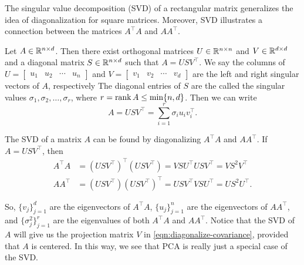The singular value decomposition (SVD) of a rectangular matrix generalizes the idea of diagonalization for square matrices.
Moreover, SVD illustrates a connection between the matrices \(A^\top A\) and \(AA^\top\).

\begin{theorem}
    \label{thm:svd}
    \cite{horn2013matrix}
    Let \(A \in \mathbb{R}^{n \times d}\).
    Then there exist orthogonal matrices \(U \in \mathbb{R}^{n \times n}\) and \(V \in \mathbb{R}^{d \times d}\) and a diagonal matrix \(S \in \mathbb{R}^{n \times d}\) such that \(A = USV^\top\).
    We say the columns of \(U = \begin{bmatrix}
        u_1 & u_2 & \cdots & u_n
    \end{bmatrix}\) and \(V = \begin{bmatrix}
        v_1 & v_2 & \cdots & v_d
    \end{bmatrix}\) are the left and right singular vectors of \(A\), respectively
    The diagonal entries of \(S\) are the called the singular values \(\sigma_1, \sigma_2, \dots, \sigma_r\), where \(r = \operatorname{rank} A \leq \min\{n,d\}\).
    Then we can write
    \begin{equation}
        \label{eqn:svd}
        A = USV^\top = \sum_{i=1}^{r} \sigma_i u_i v_i^\top.
    \end{equation}
\end{theorem}

The SVD of a matrix \(A\) can be found by diagonalizing \(A^\top A\) and \(AA^\top\).
If \(A = USV^\top\), then
\begin{align*}
    A^\top A &= (USV^\top)^\top (USV^\top) = V S U^\top U S V^\top = V S^2 V^\top\\
    AA^\top  &= (USV^\top) (USV^\top)^\top = U S V^\top V S U^\top = U S^2 U^\top.
\end{align*}

So, \(\{v_j\}_{j=1}^d\) are the eigenvectors of \(A^\top A\), \(\{u_j\}_{j=1}^n\) are the eigenvectors of \(AA^\top\), and \(\{\sigma_j^2\}_{j=1}^r\) are the eigenvalues of both \(A^\top A\) and \(AA^\top\).
Notice that the SVD of \(A\) will give us the projection matrix \(V\) in \cref{eqn:diagonalize-covariance}, provided that \(A\) is centered.
In this way, we see that PCA is really just a special case of the SVD.

